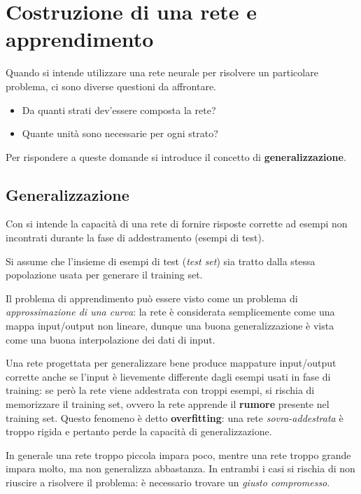 
\chapter{Costruzione di una rete e apprendimento}
\label{cha:euristiche_per_migliorare_l'apprendimento}

Quando si intende utilizzare una rete neurale per risolvere un particolare problema, ci sono diverse questioni da affrontare.
\begin{itemize}
	\item Da quanti strati dev'essere composta la rete?
	\item Quante unità sono necessarie per ogni strato?
\end{itemize}
Per rispondere a queste domande si introduce il concetto di \textbf{generalizzazione}.

\section{Generalizzazione}
\label{sec:generalizzazione}

\begin{mydef}[Generalizzazione]
	Con  si intende la capacità di una rete di fornire risposte corrette ad esempi non incontrati durante la fase di addestramento (esempi di test).
\end{mydef}
\noindent Si assume che l'insieme di esempi di test (\emph{test set}) sia tratto dalla stessa popolazione usata per generare il training set.

Il problema di apprendimento può essere visto come un problema di \emph{approssimazione di una curva}: la rete è considerata semplicemente come una mappa input/output non lineare, dunque una buona generalizzazione è vista come una buona interpolazione dei dati di input.

Una rete progettata per generalizzare bene produce mappature input/output corrette anche se l'input è lievemente differente dagli esempi usati in fase di training: se però la rete viene addestrata con troppi esempi, si rischia di memorizzare il training set, ovvero la rete apprende il \textbf{rumore} presente nel training set. Questo fenomeno è detto \textbf{overfitting}: una rete \emph{sovra-addestrata} è troppo rigida e pertanto perde la capacità di generalizzazione.

In generale una rete troppo piccola impara poco, mentre una rete troppo grande impara molto, ma non generalizza abbastanza. In entrambi i casi si rischia di non riuscire a risolvere il problema: è necessario trovare un \emph{giusto compromesso}. 

